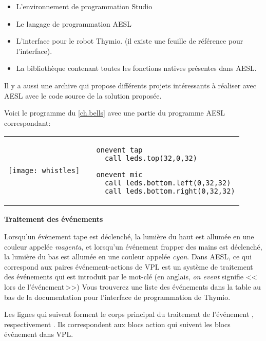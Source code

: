 \begin{itemize}
\item L'environnement de programmation Studio
\item Le langage de programmation AESL
\item L'interface pour le robot Thymio.
(il existe une feuille de référence pour l'interface).
\item La bibliothèque contenant toutes les fonctions natives présentes dans AESL.
\end{itemize}

Il y a aussi une archive qui propose différents projets intéressants à réaliser avec AESL
avec le code source de la solution proposée.


Voici le programme  du \cref{ch.bells} avec une partie du programme AESL correspondant:

\begin{center}
\begin{tabular}{ll}
\texttt{[image: whistles]} &
\begin{minipage}[b]{.5\textwidth}
\begin{footnotesize}
\begin{verbatim}
  onevent tap
    call leds.top(32,0,32)
  
  onevent mic
    call leds.bottom.left(0,32,32)
    call leds.bottom.right(0,32,32)
\end{verbatim}
\end{footnotesize}
\vspace*{8ex}
\end{minipage}
\end{tabular}
\end{center}

\textbf{\large Traitement des événements}

Lorsqu'un événement tape est déclenché, la lumière du haut est allumée en une couleur appelée
\emph{magenta},
et lorsqu'un événement frapper des mains est déclenché, la lumière du bas est allumée en une couleur 
appelée \emph{cyan}.
Dans AESL, ce qui correspond aux paires événement-actions de VPL est un système de traitement des événements
qui est introduit par le mot-clé  (en anglais, \emph{on event} signifie <<\,lors de l'événement\,>>)
Vous trouverez une liste des événements dans la table au bas de la documentation pour l'interface
de programmation de Thymio.

Les lignes qui suivent  forment le corps principal du traitement de l'événement , respectivement .
Ils correspondent aux blocs action qui suivent les blocs événement dans VPL.


